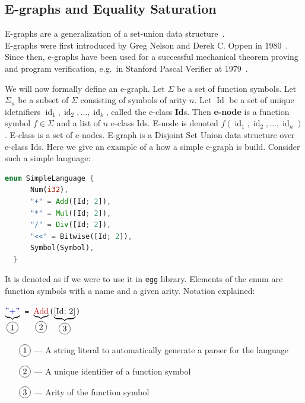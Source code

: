 \subsection{E-graphs and Equality Saturation}\label{egraphs}
E-graphs are a generalization of a set-union data structure~\cite{tarjan_1975}. \\ E-graphs were first introduced by Greg Nelson and Derek C. Oppen in 1980~\cite{nelson_1980}. Since then, e-graphs have been used for a successful mechanical theorem proving and program verification, e.g.\ in Stanford Pascal Verifier at 1979~\cite{pascal_verifier_manual_1979}. 

We will now formally define an e-graph. Let $\Sigma$ be a set of function symbols. Let $\Sigma_n$ be a subset of $\Sigma$ consisting of symbols of arity $n$. Let $\operatorname{Id}$ be a set of unique idetnifiers $\operatorname{id}_1, \operatorname{id}_2, \dots, \operatorname{id}_k$, called the e-class \textbf{Id}s. Then \textbf{e-node} is a function symbol $f \in \Sigma$ and a list of $n$ e-class Ids. E-node is denoted $f(\operatorname{id}_1, \operatorname{id}_2, \dots, \operatorname{id}_n)$. E-class is a set of e-nodes. E-graph is a Disjoint Set Union data structure over e-class Ids. Here we give an example of a how a simple e-graph is build. Consider such a simple language: 
\begin{center}
 \begin{lstlisting}[language=rust, style=colouredRust]
  enum SimpleLanguage {
      Num(i32),
      "+" = Add([Id; 2]),
      "*" = Mul([Id; 2]),
      "/" = Div([Id; 2]),
      "<<" = Bitwise([Id; 2]),
      Symbol(Symbol),
  }
  \end{lstlisting}
\end{center}
It is denoted as if we were to use it in \texttt{egg} library. Elements of the enum are function symbols with a name and a given arity. Notation explained: 
\begin{center}
  \texttt{$\underbrace{\text{\textcolor{rust_blue}{''+''}}}_{\circled{1}}$ = $\underbrace{\text{\textcolor{rust_red}{Add}}}_{\circled{2}}$($\underbrace{\text{[Id; 2]}}_{\circled{3}}$)}
\end{center}
\begin{enumerate}
  \item[$\circled{1}$] --- A string literal to automatically generate a parser for the language
  \item[$\circled{2}$] --- A unique identifier of a function symbol
  \item[$\circled{3}$] --- Arity of the function symbol
\end{enumerate}
